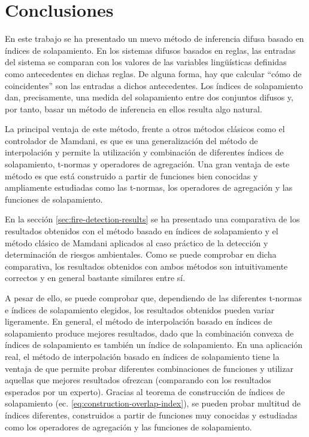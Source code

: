 \chapter{Conclusiones}
En este trabajo se ha presentado un nuevo método de inferencia difusa basado en índices de solapamiento. En los sistemas difusos basados en reglas, las entradas del sistema se comparan con los valores de las variables lingüísticas definidas como antecedentes en dichas reglas. De alguna forma, hay que calcular ``cómo de coincidentes'' son las entradas a dichos antecedentes. Los índices de solapamiento dan, precisamente, una medida del solapamiento entre dos conjuntos difusos y, por tanto, basar un método de inferencia en ellos resulta algo natural.

La principal ventaja de este método, frente a otros métodos clásicos como el controlador de Mamdani, es que es una generalización del método de interpolación y permite la utilización y combinación de diferentes índices de solapamiento, t-normas y operadores de agregación. Una gran ventaja de este método es que está construido a partir de funciones bien conocidas y ampliamente estudiadas como las t-normas, los operadores de agregación y las funciones de solapamiento.

En la sección \ref{sec:fire-detection-results} se ha presentado una comparativa de los resultados obtenidos con el método basado en índices de solapamiento y el método clásico de Mamdani aplicados al caso práctico de la detección y determinación de riesgos ambientales. Como se puede comprobar en dicha comparativa, los resultados obtenidos con ambos métodos son intuitivamente correctos y en general bastante similares entre sí. 

A pesar de ello, se puede comprobar que, dependiendo de las diferentes t-normas e índices de solapamiento elegidos, los resultados obtenidos pueden variar ligeramente. En general, el método de interpolación basado en índices de solapamiento produce mejores resultados, dado que la combinación convexa de índices de solapamiento es también un índice de solapamiento. En una aplicación real, el método de interpolación basado en índices de solapamiento tiene la ventaja de que permite probar diferentes combinaciones de funciones y utilizar aquellas que mejores resultados ofrezcan (comparando con los resultados esperados por un experto). Gracias al teorema de construcción de índices de solapamiento (ec. \ref{eq:construction-overlap-index}), se pueden probar multitud de índices diferentes, construidos a partir de funciones muy conocidas y estudiadas como los operadores de agregación y las funciones de solapamiento.

